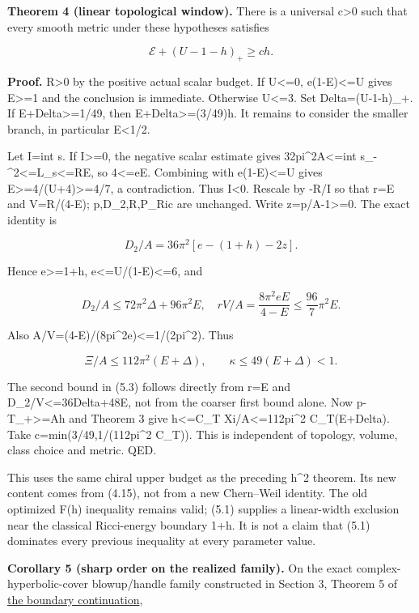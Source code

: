 \documentclass[
  10pt,
]{article}
\begin{document}
\textbf{Theorem 4 (linear topological window).} There is a universal
c\textgreater0 such that every smooth metric under these hypotheses
satisfies

\[
              \boxed{\mathcal E+(U-1-h)_+\ge c h.}    \tag{5.1}
\]

\textbf{Proof.} R\textgreater0 by the positive actual scalar budget. If
U\textless=0, e(1-E)\textless=U gives E\textgreater=1 and the conclusion
is immediate. Otherwise U\textless=3. Set Delta=(U-1-h)\_+. If
E+Delta\textgreater=1/49, then E+Delta\textgreater=(3/49)h. It remains
to consider the smaller branch, in particular E\textless1/2.

Let I=int s. If I\textgreater=0, the negative scalar estimate gives
32pi\^{}2A\textless=int s\_-\^{}2\textless=L\_s\textless=RE, so
4\textless=eE. Combining with e(1-E)\textless=U gives
E\textgreater=4/(U+4)\textgreater=4/7, a contradiction. Thus
I\textless0. Rescale by -R/I so that r=E and V=R/(4-E); p,D\_2,R,P\_Ric
are unchanged. Write z=p/A-1\textgreater=0. The exact identity is

\[
          D_2/A=36\pi^2[e-(1+h)-2z].                 \tag{5.2}
\]

Hence e\textgreater=1+h, e\textless=U/(1-E)\textless=6, and

\[
 D_2/A\le72\pi^2\Delta+96\pi^2E,\quad
 rV/A=\frac{8\pi^2eE}{4-E}\le\frac{96}{7}\pi^2E.
\]

Also A/V=(4-E)/(8pi\^{}2e)\textless=1/(2pi\^{}2). Thus

\[
 \Xi/A\le112\pi^2(E+\Delta),\qquad
 \kappa\le49(E+\Delta)<1.                            \tag{5.3}
\]

The second bound in (5.3) follows directly from r=E and
D\_2/V\textless=36Delta+48E, not from the coarser first bound alone. Now
p-T\_+\textgreater=Ah and Theorem 3 give h\textless=C\_T
Xi/A\textless=112pi\^{}2 C\_T(E+Delta). Take c=min(3/49,1/(112pi\^{}2
C\_T)). This is independent of topology, volume, class choice and
metric. QED.

This uses the same chiral upper budget as the preceding h\^{}2 theorem.
Its new content comes from (4.15), not from a new Chern--Weil identity.
The old optimized F(h) inequality remains valid; (5.1) supplies a
linear-width exclusion near the classical Ricci-energy boundary 1+h. It
is not a claim that (5.1) dominates every previous inequality at every
parameter value.

\textbf{Corollary 5 (sharp order on the realized family).} On the exact
complex-hyperbolic-cover blowup/handle family constructed in Section 3,
Theorem 5 of \href{20260926_boundary_compatibility.md}{the boundary
continuation},
\end{document}
